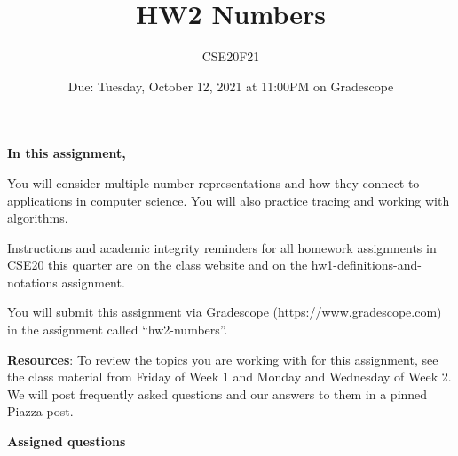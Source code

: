 \documentclass[12pt, oneside]{article}
\author{CSE20F21}
\title{HW2 Numbers}
\date{Due: Tuesday, October 12, 2021 at 11:00PM on Gradescope}
\begin{document}
\maketitle
\thispagestyle{fancy}


{\bf In this assignment,}

You will consider multiple number representations and how they connect 
to applications in computer science. You will also practice tracing
and working with algorithms.

Instructions and academic integrity reminders for all homework assignments in 
CSE20 this quarter are on the class website and on the hw1-definitions-and-notations
assignment.


You will submit this assignment via Gradescope
(\href{https://www.gradescope.com}{https://www.gradescope.com}) 
in the assignment called ``hw2-numbers''.


{\bf Resources}: To review the topics you are working with 
for this assignment, see the class material from Friday of Week 1 and Monday
 and Wednesday of Week 2.
We will post frequently asked questions and our answers to them in a 
pinned Piazza post.

{\bf Assigned questions}
\end{document}
